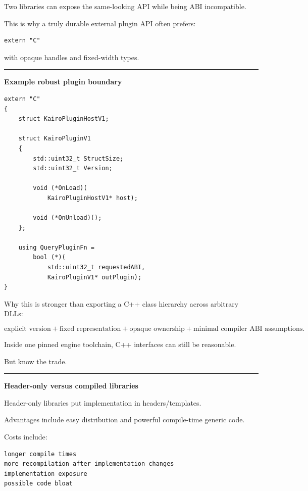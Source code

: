 Two libraries can expose the same-looking API while being ABI incompatible.

This is why a truly durable external plugin API often prefers:

\begin{verbatim}
extern "C"
\end{verbatim}

with opaque handles and fixed-width types.

\begin{center}\rule{0.5\linewidth}{0.5pt}\end{center}

\textbf{Example robust plugin boundary}

\begin{verbatim}
extern "C"
{
    struct KairoPluginHostV1;

    struct KairoPluginV1
    {
        std::uint32_t StructSize;
        std::uint32_t Version;

        void (*OnLoad)(
            KairoPluginHostV1* host);

        void (*OnUnload)();
    };

    using QueryPluginFn =
        bool (*)(
            std::uint32_t requestedABI,
            KairoPluginV1* outPlugin);
}
\end{verbatim}

Why this is stronger than exporting a C++ class hierarchy across arbitrary DLLs:

\[
\boxed{
\text{explicit version}
+
\text{fixed representation}
+
\text{opaque ownership}
+
\text{minimal compiler ABI assumptions}.
}
\]

Inside one pinned engine toolchain, C++ interfaces can still be reasonable.

But know the trade.

\begin{center}\rule{0.5\linewidth}{0.5pt}\end{center}

\textbf{Header-only versus compiled libraries}

Header-only libraries put implementation in headers/templates.

Advantages include easy distribution and powerful compile-time generic code.

Costs include:

\begin{verbatim}
longer compile times
more recompilation after implementation changes
implementation exposure
possible code bloat
\end{verbatim}

